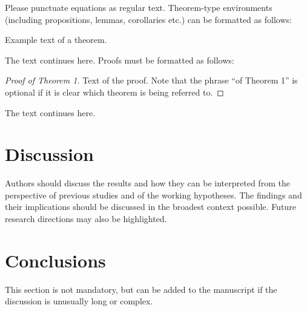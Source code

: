 \documentclass[entropy,article,submit,moreauthors,pdftex]{Definitions/mdpi}
\begin{document}
\begin{paracol}{2}
\linenumbers
\switchcolumn

Please punctuate equations as regular text. Theorem-type environments (including propositions, lemmas, corollaries etc.) can be formatted as follows:
\begin{Theorem}
Example text of a theorem.
\end{Theorem}

The text continues here. Proofs must be formatted as follows:

\begin{proof}[Proof of Theorem 1]
Text of the proof. Note that the phrase ``of Theorem 1'' is optional if it is clear which theorem is being referred to.
\end{proof}
The text continues here.

\section{Discussion}

Authors should discuss the results and how they can be interpreted from the perspective of previous studies and of the working hypotheses. The findings and their implications should be discussed in the broadest context possible. Future research directions may also be highlighted.

\section{Conclusions}

This section is not mandatory, but can be added to the manuscript if the discussion is unusually long or complex.



\end{paracol}
\end{document}

